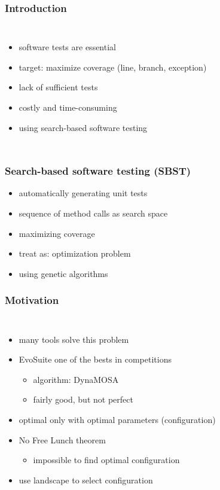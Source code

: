\begin{frame}
	\frametitle{Introduction}
	
	\begin{columns}[c]
		
		\column{\textwidth}
		\begin{itemize}
			\item software tests are essential
			\item target: maximize coverage (line, branch, exception)
			\item lack of sufficient tests
			\item costly and time-consuming
			\item using search-based software testing
		\end{itemize}
		
	\end{columns}
	
\end{frame}

\begin{frame}
	\frametitle{Search-based software testing (SBST)}
	
	\begin{itemize}
		\item automatically generating unit tests
		\item sequence of method calls as search space
		\item maximizing coverage
		\item treat as: optimization problem
		\item using genetic algorithms
	\end{itemize}
			
	
\end{frame}

\begin{frame}
	\frametitle{Motivation}
	
	\begin{columns}[c]
		
		\column{\textwidth}
		\begin{itemize}
			\item many tools solve this problem
			\item EvoSuite one of the bests in competitions \cite{Panichella.2020}
			\begin{itemize}
				\item algorithm: DynaMOSA  
				\item fairly good, but not perfect \cite{Arcuri.2014}
			\end{itemize}
			\item optimal only with optimal parameters (configuration)
			\item No Free Lunch theorem \cite{Wolpert.1997}
				\begin{itemize}
					\item impossible to find optimal configuration
				\end{itemize}
			\item use landscape to select configuration
		\end{itemize}
		
	\end{columns}
	
\end{frame}

